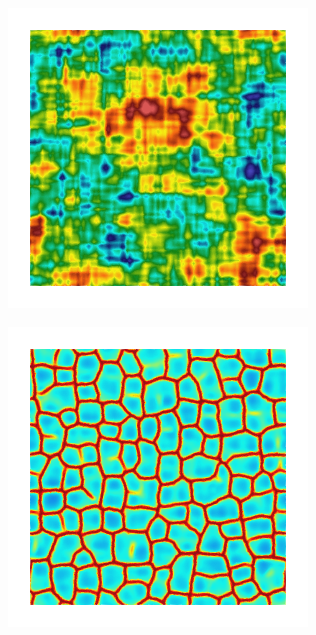 \begin{figure}[!htb]
\begin{subfigure}[b]{0.15\textwidth}
    \end{subfigure}
    \begin{subfigure}[b]{0.15\textwidth}
        \includegraphics[width=\textwidth]{past/figures/psic_exp_cartesian_10_10_rho_0_seed_b.png}
    \end{subfigure}
    \begin{subfigure}[b]{0.15\textwidth}
        \includegraphics[width=\textwidth]{past/figures/d_exp_cartesian_10_10_rho_0_seed_b.png}
    \end{subfigure}


\end{figure}
